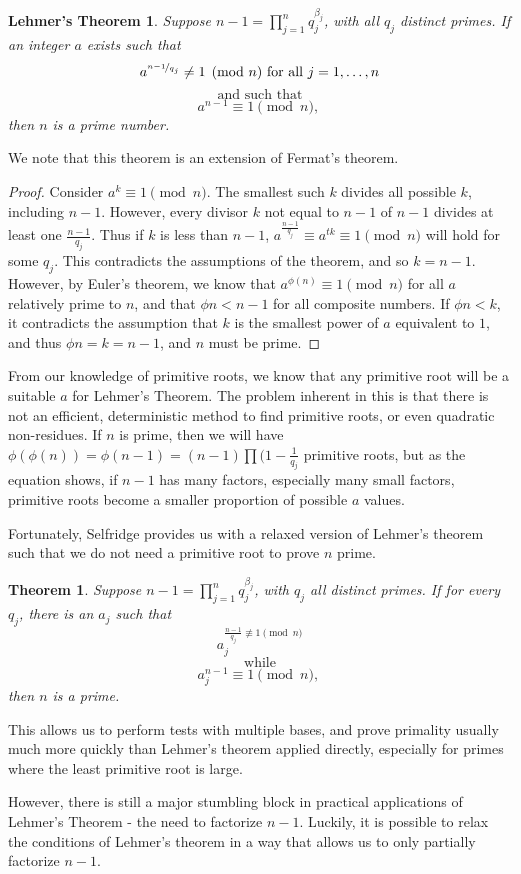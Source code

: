 \documentclass{article}
\newtheorem*{theorem}{Theorem}
\begin{document}
\newtheorem*{lehmer}{Lehmer's Theorem}
\begin{lehmer}
Suppose $n-1 = \prod^n_{j=1} q_j^{\beta_j}$, with all $q_j$ distinct primes. If an integer $a$ exists such that 
	$$a^{\nicefrac{n-1}{q_j}} \neq 1 \pmod n \text{ for all } j = 1, \ldots, n$$
	$$\text { and such that }$$
	$$a^{n-1} \equiv 1\pmod n \text{, }$$
then $n$ is a prime number.
\end{lehmer}
We note that this theorem is an extension of Fermat's theorem. 
\begin{proof}
Consider $a^k \equiv 1 \pmod n$. The smallest such $k$ divides all possible $k$, including $n-1$. However, every divisor $k$ not equal to $n-1$ of $n-1$ divides at least one $\frac{n-1}{q_j}$. Thus if $k$ is  less than $n-1$,  $a^{\frac{n-1}{q_j}} \equiv a^{tk}\equiv 1 \pmod n$ will hold for some $q_j$. This contradicts the assumptions of the theorem, and so $k = n-1$. However, by Euler's theorem, we know that $a^{\phi(n)} \equiv 1 \pmod n$ for all $a$ relatively prime to $n$, and that $\phi{n} < n-1$ for all composite numbers. If $\phi{n} < k$, it contradicts the assumption that $k$ is the smallest power of $a$ equivalent to $1$, and thus $\phi{n} = k = n-1$, and $n$ must be prime.
\end{proof}

\par From our knowledge of primitive roots, we know that any primitive root will be a suitable $a$ for Lehmer's Theorem. The problem inherent in this is that there is not an efficient, deterministic method to find primitive roots, or even quadratic non-residues. If $n$ is prime, then we will have $\phi(\phi(n)) = \phi(n-1) = (n-1) \prod (1- \frac{1}{q_j}$ primitive roots, but as the equation shows, if $n-1$ has many factors, especially many small factors, primitive roots become a smaller proportion of possible $a$ values.

 \par Fortunately, Selfridge provides us with a relaxed version of Lehmer's theorem such that we do not need a primitive root to prove $n$ prime.
\begin{theorem}
Suppose $n-1 = \prod^n_{j=1} q_j^{\beta_j}$, with $q_j$ all distinct primes.  If for every $q_j$, there is an $a_j$ such that
	$$a_j^{\frac{n-1}{q_j} \not\equiv 1 \pmod n}$$ 
	$$\text{ while }$$
	$$a_j^{n-1} \equiv 1 \pmod n \text{, }$$
then $n$ is a prime.
\end{theorem}
\par This allows us to perform tests with multiple bases, and prove primality usually much more quickly than Lehmer's theorem applied directly, especially for primes where the least primitive root is large.
\par However, there is still a major stumbling block in practical applications of Lehmer's Theorem - the need to factorize $n -1$. Luckily, it is possible to relax the conditions of Lehmer's theorem in a way that allows us to only partially factorize $n-1$.
\end{document}
